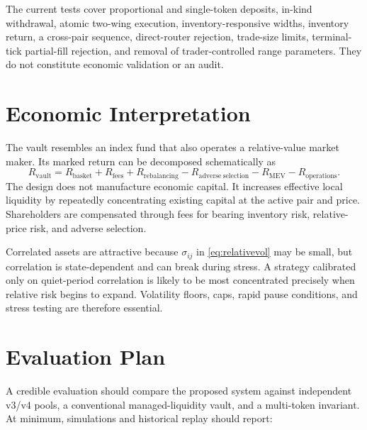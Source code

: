 \documentclass[11pt]{article}
\begin{document}
The current tests cover proportional and single-token deposits, in-kind
withdrawal, atomic two-wing execution, inventory-responsive widths, inventory
return, a cross-pair sequence, direct-router rejection, trade-size limits,
terminal-tick partial-fill rejection, and removal of trader-controlled range
parameters. They do not constitute economic validation or an audit.

\section{Economic Interpretation}

The vault resembles an index fund that also operates a relative-value market
maker. Its marked return can be decomposed schematically as
\begin{equation}
  R_{\mathrm{vault}}=
  R_{\mathrm{basket}}
  +R_{\mathrm{fees}}
  +R_{\mathrm{rebalancing}}
  -R_{\mathrm{adverse\ selection}}
  -R_{\mathrm{MEV}}
  -R_{\mathrm{operations}}.
  \label{eq:return}
\end{equation}
The design does not manufacture economic capital. It increases effective local
liquidity by repeatedly concentrating existing capital at the active pair and
price. Shareholders are compensated through fees for bearing inventory risk,
relative-price risk, and adverse selection.

Correlated assets are attractive because $\sigma_{ij}$ in
\cref{eq:relativevol} may be small, but correlation is state-dependent and can
break during stress. A strategy calibrated only on quiet-period correlation is
likely to be most concentrated precisely when relative risk begins to expand.
Volatility floors, caps, rapid pause conditions, and stress testing are
therefore essential.

\section{Evaluation Plan}

A credible evaluation should compare the proposed system against independent
v3/v4 pools, a conventional managed-liquidity vault, and a multi-token
invariant. At minimum, simulations and historical replay should report:
\end{document}
